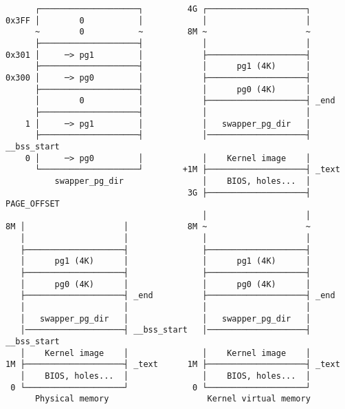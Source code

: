 \documentclass[varwidth=50em]{standalone}
\begin{document}
\begin{verbatim}
      ┌────────────────────┐         4G ┌────────────────────┐
0x3FF │        0           │            │                    │
      ~        0           ~         8M ~                    ~
      ├────────────────────┤            │                    │
0x301 │     ─> pg1         │            ├────────────────────┤
      ├────────────────────┤            │      pg1 (4K)      │
0x300 │     ─> pg0         │            ├────────────────────┤
      ├────────────────────┤            │      pg0 (4K)      │
      │        0           │            ├────────────────────┤ _end
      ├────────────────────┤            │                    │
    1 │     ─> pg1         │            │   swapper_pg_dir   │
      ├────────────────────┤            │────────────────────┤ __bss_start
    0 │     ─> pg0         │            │    Kernel image    │
      └────────────────────┘        +1M ├────────────────────┤ _text
          swapper_pg_dir                │    BIOS, holes...  │
                                     3G ├────────────────────┤ PAGE_OFFSET
                                        │                    │
8M │                    │            8M ~                    ~
   │                    │               │                    │
   ├────────────────────┤               ├────────────────────┤
   │      pg1 (4K)      │               │      pg1 (4K)      │
   ├────────────────────┤               ├────────────────────┤
   │      pg0 (4K)      │               │      pg0 (4K)      │
   ├────────────────────┤ _end          ├────────────────────┤ _end
   │                    │               │                    │
   │   swapper_pg_dir   │               │   swapper_pg_dir   │
   │────────────────────┤ __bss_start   │────────────────────┤ __bss_start
   │    Kernel image    │               │    Kernel image    │
1M ├────────────────────┤ _text      1M ├────────────────────┤ _text
   │    BIOS, holes...  │               │    BIOS, holes...  │
 0 └────────────────────┘             0 └────────────────────┘
      Physical memory                    Kernel virtual memory
\end{verbatim}
\end{document}
